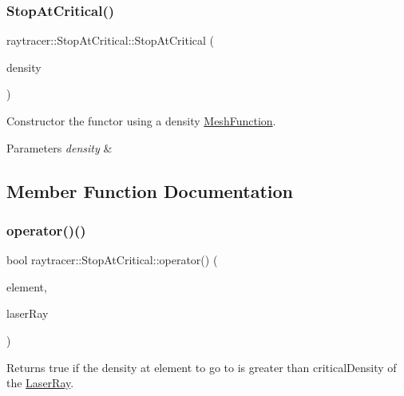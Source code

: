 \subsubsection{\texorpdfstring{Stop\+At\+Critical()}{StopAtCritical()}}
{\footnotesize\ttfamily raytracer\+::\+Stop\+At\+Critical\+::\+Stop\+At\+Critical (\begin{DoxyParamCaption}\item[{const \hyperlink{classraytracer_1_1MeshFunction}{Mesh\+Function} \&}]{density }\end{DoxyParamCaption})\hspace{0.3cm}{\ttfamily [explicit]}}



Constructor the functor using a density \hyperlink{classraytracer_1_1MeshFunction}{Mesh\+Function}. 


\begin{DoxyParams}{Parameters}
{\em density} & \\
\hline
\end{DoxyParams}


\subsection{Member Function Documentation}
\mbox{\label{structraytracer_1_1StopAtCritical_acc71054d773ea6fe0df52986d5d1512e}} 
\subsubsection{\texorpdfstring{operator()()}{operator()()}}
{\footnotesize\ttfamily bool raytracer\+::\+Stop\+At\+Critical\+::operator() (\begin{DoxyParamCaption}\item[{const \hyperlink{classraytracer_1_1Element}{Element} \&}]{element,  }\item[{const \hyperlink{classraytracer_1_1LaserRay}{Laser\+Ray} \&}]{laser\+Ray }\end{DoxyParamCaption})}



Returns true if the density at element to go to is greater than critical\+Density of the \hyperlink{classraytracer_1_1LaserRay}{Laser\+Ray}. 


